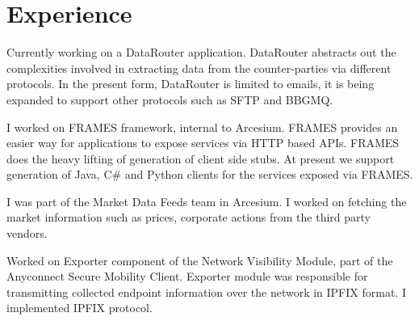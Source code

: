 \documentclass[]{deedy-resume-openfont}
\begin{document}
\hfill
\begin{minipage}[t]{0.66\textwidth} 


\section{Experience}
\vspace{2.0mm}

\vspace{\topsep} %

\begin{tightemize}
\vspace{1.0mm}
\item Currently working on a DataRouter application. DataRouter abstracts out the complexities involved in extracting data from the counter-parties via different protocols. In the present form, DataRouter is limited to emails, it is being expanded to support other protocols such as SFTP and BBGMQ.

\vspace{1.0mm}

\item I worked on FRAMES framework, internal to Arcesium. FRAMES provides an easier way for applications to expose services via HTTP based APIs. FRAMES does the heavy lifting of generation of client side stubs. At present we support generation of Java, C\# and Python clients for the services exposed via FRAMES.

\vspace{1.0mm}

\item I was part of the Market Data Feeds team in Arcesium. I worked on fetching the market information such as prices, corporate actions from the third party vendors.
\end{tightemize}
\sectionsep

\begin{tightemize}
\vspace{1.0mm}
\item Worked on Exporter component of the Network Visibility Module, part of the Anyconnect Secure Mobility Client. Exporter module was responsible for transmitting collected endpoint information over the network in IPFIX format. I implemented IPFIX protocol.


\end{tightemize}
\end{minipage}
\end{document}
